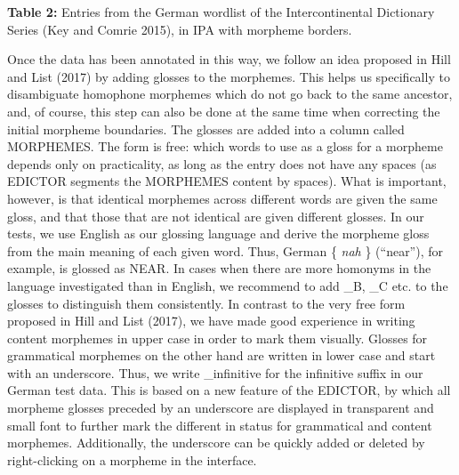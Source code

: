 \documentclass[
  a4paper,
  14pt,
  oneside,
  tablecaptionabove
]{scrbook}
\begin{document}

\textbf{Table 2:} Entries from the German wordlist of the
Intercontinental Dictionary Series (Key and Comrie 2015), in IPA with
morpheme borders.

Once the data has been annotated in this way, we follow an idea proposed
in Hill and List (2017) by adding glosses to the morphemes. This helps
us specifically to disambiguate homophone morphemes which do not go back
to the same ancestor, and, of course, this step can also be done at the
same time when correcting the initial morpheme boundaries. The glosses
are added into a column called MORPHEMES. The form is free: which words
to use as a gloss for a morpheme depends only on practicality, as long
as the entry does not have any spaces (as EDICTOR segments the MORPHEMES
content by spaces). What is important, however, is that identical
morphemes across different words are given the same gloss, and that
those that are not identical are given different glosses. In our tests,
we use English as our glossing language and derive the morpheme gloss
from the main meaning of each given word. Thus, German \{ \emph{nah} \}
(\enquote{near}), for example, is glossed as NEAR. In cases when there
are more homonyms in the language investigated than in English, we
recommend to add \_B, \_C etc. to the glosses to distinguish them
consistently. In contrast to the very free form proposed in Hill and
List (2017), we have made good experience in writing content morphemes
in upper case in order to mark them visually. Glosses for grammatical
morphemes on the other hand are written in lower case and start with an
underscore. Thus, we write { \_infinitive } for the infinitive suffix in
our German test data. This is based on a new feature of the EDICTOR, by
which all morpheme glosses preceded by an underscore are displayed in
transparent and small font to further mark the different in status for
grammatical and content morphemes. Additionally, the underscore can be
quickly added or deleted by right-clicking on a morpheme in the
interface.
\end{document}

